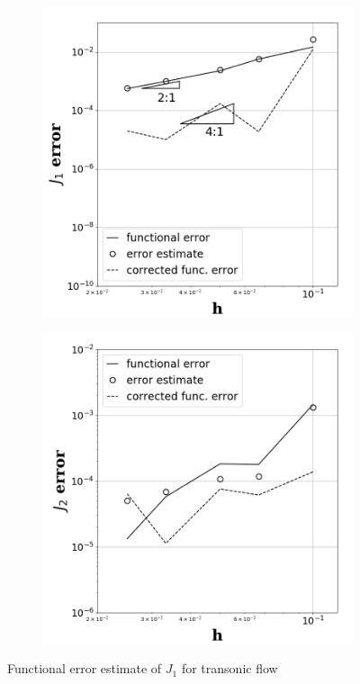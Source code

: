 \documentclass[a4paper]{article}
\begin{document}
\begin{figure}[!htbp]
  \centering
  \centering
  \begin{subfigure}{0.45\textwidth}
    \centering
    \includegraphics[width=1.0\linewidth]{figures/transonic_p1_J1.png}
    \label{fig:transonic_p1_j1}
  \end{subfigure}
  \begin{subfigure}{0.45\textwidth}
    \centering
    \includegraphics[width=1.0\linewidth]{figures/transonic_p2_J1.png}
    \label{fig:transonic_p2_j1}
  \end{subfigure}
  \caption{Functional error estimate of $J_1$ for transonic flow}
  \label{fig:tran_func_error_J1}
\end{figure}
\end{document}
